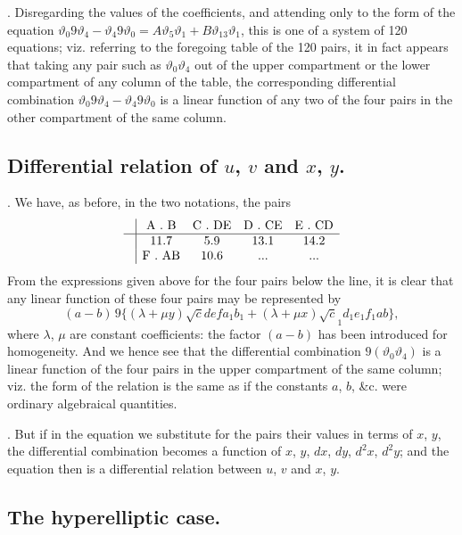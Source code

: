 \documentclass[12pt]{article}
\theoremstyle{plain}
\begin{document}
\newpage
\setcounter{page}{563}

. Disregarding the values of the coefficients, and attending only to the form of the equation $\vartheta_0 9\vartheta_4 - \vartheta_4 9\vartheta_0 = A \vartheta_5 \vartheta_1 + B \vartheta_{13} \vartheta_1$, this is one of a system of 120 equations; viz. referring to the foregoing table of the 120 pairs, it in fact appears that taking any pair such as $\vartheta_0 \vartheta_4$ out of the upper compartment or the lower compartment of any column of the table, the corresponding differential combination $\vartheta_0 9\vartheta_4 - \vartheta_4 9\vartheta_0$ is a linear function of any two of the four pairs in the other compartment of the same column.

\subsection*{Differential relation of $u$, $v$ and $x$, $y$.}

. We have, as before, in the two notations, the pairs
\[
\begin{array}{c|cccc}
& \text{A . B} & \text{C . DE} & \text{D . CE} & \text{E . CD} \\
\hline
& 11 . 7 & 5 . 9 & 13 . 1 & 14 . 2 \\
& \text{F . AB} & 10 . 6 & \text{...} & \text{...}
\end{array}
\]
From the expressions given above for the four pairs below the line, it is clear that any linear function of these four pairs may be represented by
\[
(a - b)\, 9\{(\lambda + \mu y)\surd cdef a_1 b_1 + (\lambda + \mu x)\surd c_1 d_1 e_1 f_1 ab\},
\]
where $\lambda$, $\mu$ are constant coefficients: the factor $(a - b)$ has been introduced for homogeneity. And we hence see that the differential combination $9(\vartheta_0 \vartheta_4)$ is a linear function of the four pairs in the upper compartment of the same column; viz. the form of the relation is the same as if the constants $a$, $b$, \&c. were ordinary algebraical quantities.

\newpage
\setcounter{page}{564}

. But if in the equation we substitute for the pairs their values in terms of $x$, $y$, the differential combination becomes a function of $x$, $y$, $dx$, $dy$, $d^2x$, $d^2y$; and the equation then is a differential relation between $u$, $v$ and $x$, $y$.

\subsection*{The hyperelliptic case.}
\end{document}
